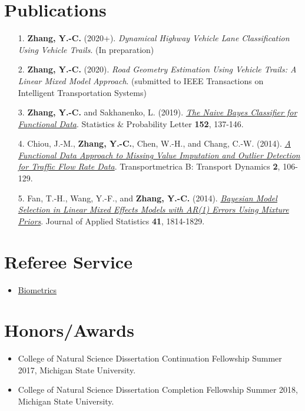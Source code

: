 \documentclass[a4paper,10pt,dvipdfmx]{article}
\begin{document}
\section*{Publications}
\begin{itemize}
  \item[1.] \textbf{Zhang, Y.-C.} (2020+). \textit{Dynamical Highway Vehicle Lane Classification Using Vehicle Trails}. (In preparation)
  \item[2.] \textbf{Zhang, Y.-C.} (2020). \textit{Road Geometry Estimation Using Vehicle Trails: A Linear Mixed Model Approach}. (submitted to IEEE Transactions on Intelligent Transportation Systems)
  \item[3.] \textbf{Zhang, Y.-C.} and Sakhanenko, L. (2019). \href{https://www.sciencedirect.com/science/article/pii/S0167715219301208}{\textit{The Naive Bayes Classifier for Functional Data}}. Statistics \& Probability Letter \textbf{152}, 137-146.
  \item[4.] Chiou, J.-M., \textbf{Zhang, Y.-C.}, Chen, W.-H., and Chang, C.-W. (2014). \href{http://www.tandfonline.com/doi/abs/10.1080/21680566.2014.892847}{\textit{A Functional Data Approach to Missing Value Imputation and Outlier Detection for Traffic Flow Rate Data}}. Transportmetrica B: Transport Dynamics \textbf{2}, 106-129.
  \item[5.] Fan, T.-H., Wang, Y.-F., and \textbf{Zhang, Y.-C.} (2014). \href{http://www.tandfonline.com/doi/abs/10.1080/02664763.2014.894001?journalCode=cjas20}{\textit{Bayesian Model Selection in Linear Mixed Effects Models with AR(1) Errors Using Mixture Priors}}. Journal of Applied Statistics \textbf{41}, 1814-1829.
\end{itemize}

\section*{Referee Service}
\begin{itemize}
  \item \href{https://chris7462.github.io/BIOM_Reviewer_Certificate.pdf}{Biometrics}
\end{itemize}

\section*{Honors/Awards}
\begin{itemize}
  \item College of Natural Science Dissertation Continuation Fellowship Summer 2017, Michigan State University.
  \item College of Natural Science Dissertation Completion Fellowship Summer 2018, Michigan State University.
\end{itemize}
\end{document}
